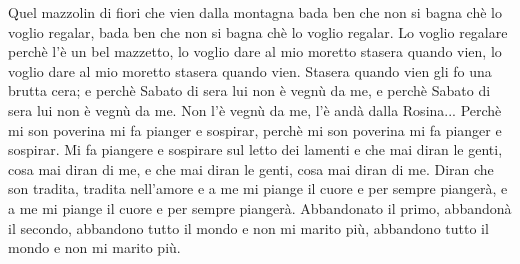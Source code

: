 \chordsoff
\beginverse
Quel mazzolin di fiori
che vien dalla montagna
bada ben che non si bagna
chè lo voglio regalar,
bada ben che non si bagna
chè lo voglio regalar.
\endverse
\beginverse
Lo voglio regalare
perchè l'è un bel mazzetto,
lo voglio dare al mio moretto
stasera quando vien,
lo voglio dare al mio moretto
stasera quando vien.
\endverse
\beginverse
Stasera quando vien
gli fo una brutta cera;
e perchè Sabato di sera
lui non è vegnù da me,
e perchè Sabato di sera
lui non è vegnù da me.
\endverse
\beginverse
Non l'è vegnù da me,
l'è andà dalla Rosina...
Perchè mi son poverina
mi fa pianger e sospirar,
perchè mi son poverina
mi fa pianger e sospirar.
\endverse
\beginverse
Mi fa piangere e sospirare
sul letto dei lamenti
e che mai diran le genti,
cosa mai diran di me,
e che mai diran le genti,
cosa mai diran di me.
\endverse
\beginverse
Diran che son tradita,
tradita nell'amore
e a me mi piange il cuore
e per sempre piangerà,
e a me mi piange il cuore
e per sempre piangerà.
\endverse
\beginverse
Abbandonato il primo,
abbandonà il secondo,
abbandono tutto il mondo
e non mi marito più,
abbandono tutto il mondo
e non mi marito più. 
\endverse
\endsong




